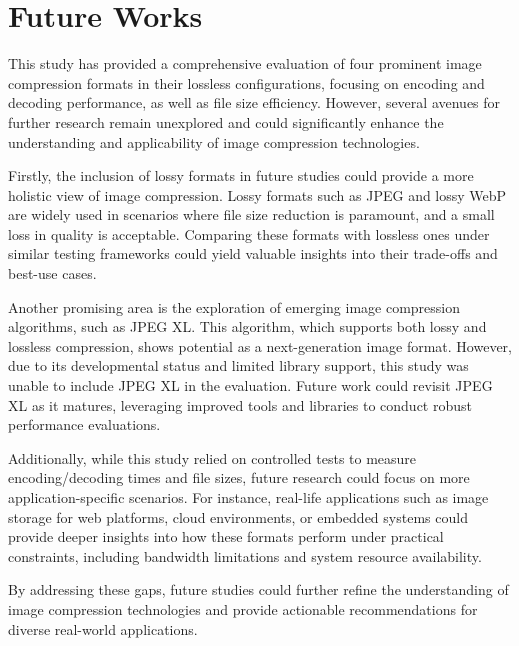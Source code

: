 \documentclass[conference]{IEEEtran}
\begin{document}
\section{Future Works}

This study has provided a comprehensive evaluation of four prominent image compression formats in their lossless configurations, focusing on encoding and decoding performance, as well as file size efficiency. However, several avenues for further research remain unexplored and could significantly enhance the understanding and applicability of image compression technologies.

Firstly, the inclusion of lossy formats in future studies could provide a more holistic view of image compression. Lossy formats such as JPEG and lossy WebP are widely used in scenarios where file size reduction is paramount, and a small loss in quality is acceptable. Comparing these formats with lossless ones under similar testing frameworks could yield valuable insights into their trade-offs and best-use cases.

Another promising area is the exploration of emerging image compression algorithms, such as JPEG XL. This algorithm, which supports both lossy and lossless compression, shows potential as a next-generation image format. However, due to its developmental status and limited library support, this study was unable to include JPEG XL in the evaluation. Future work could revisit JPEG XL as it matures, leveraging improved tools and libraries to conduct robust performance evaluations.

Additionally, while this study relied on controlled tests to measure encoding/decoding times and file sizes, future research could focus on more application-specific scenarios. For instance, real-life applications such as image storage for web platforms, cloud environments, or embedded systems could provide deeper insights into how these formats perform under practical constraints, including bandwidth limitations and system resource availability.

By addressing these gaps, future studies could further refine the understanding of image compression technologies and provide actionable recommendations for diverse real-world applications.





\vspace{12pt}
\end{document}
